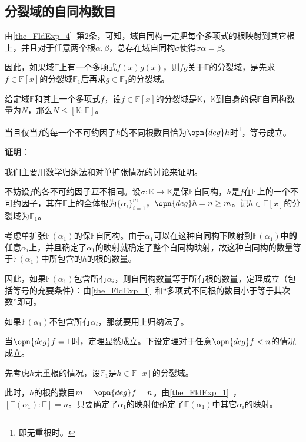\subsection{分裂域的自同构数目}

由\autoref{the_FldExp_4}~第2条，可知，域自同构一定把每个多项式的根映射到其它根上，并且对于任意两个根$\alpha, \beta$，总存在域自同构$\sigma$使得$\sigma \alpha=\beta$。

因此，如果域$\mathbb{F}$上有一个多项式$f(x)g(x)$，则$fg$关于$\mathbb{F}$的分裂域，是先求$f\in\mathbb{F}[x]$的分裂域$\mathbb{F}_1$后再求$g\in\mathbb{F}_1$的分裂域。


\begin{theorem}{}\label{the_SpltFd_1}
给定域$\mathbb{F}$和其上一个多项式$f$，设$f\in\mathbb{F}[x]$的分裂域是$\mathbb{K}$，$\mathbb{K}$到自身的保$\mathbb{F}$自同构数量为$N$，那么$N\leq[\mathbb{K}:\mathbb{F}]$。

当且仅当$f$的每一个不可约因子$h$的不同根数目恰为$\opn{deg}h$时\footnote{即无重根时。}，等号成立。
\end{theorem}

\textbf{证明}：

我们主要用数学归纳法和对单扩张情况的讨论来证明。

不妨设$f$的各不可约因子互不相同。设$\sigma:\mathbb{K}\to\mathbb{K}$是保$\mathbb{F}$自同构，$h$是$f$在$\mathbb{F}$上的一个不可约因子，其在$\overline{\mathbb{F}}$上的全体根为$\{\alpha_i\}_{i=1}^m$，$\opn{deg}h=n\geq m$。记$h\in\mathbb{F}[x]$的分裂域为$\mathbb{F}_1$。

考虑单扩张$\mathbb{F}(\alpha_1)$的保$\mathbb{F}$自同构。由于$\alpha_1$可以在这种自同构下映射到$\mathbb{F}(\alpha_1)$\textbf{中的}任意$\alpha_i$上，并且确定了$\alpha_1$的映射就确定了整个自同构映射，故这种自同构的数量等于$\mathbb{F}(\alpha_1)$中所包含的$h$的根的数量。

因此，如果$\mathbb{F}(\alpha_1)$包含所有$\alpha_i$，则自同构数量等于所有根的数量，定理成立（包括等号的充要条件）：由\autoref{the_FldExp_1}~和“多项式不同根的数目小于等于其次数”即可。

如果$\mathbb{F}(\alpha_1)$不包含所有$\alpha_i$，那就要用上归纳法了。

当$\opn{deg}f=1$时，定理显然成立。下设定理对于任意$\opn{deg}f<n$的情况成立。

先考虑$h$无重根的情况，设$\mathbb{F}_1$是$h\in\mathbb{F}[x]$的分裂域。

此时，$h$的根的数目$m=\opn{deg}f=n$。由\autoref{the_FldExp_1}~，$[\mathbb{F}(\alpha_1):
\mathbb{F}]=n$。只要确定了$\alpha_1$的映射便确定了$\mathbb{F}(\alpha_1)$中其它$\alpha_i$的映射。

